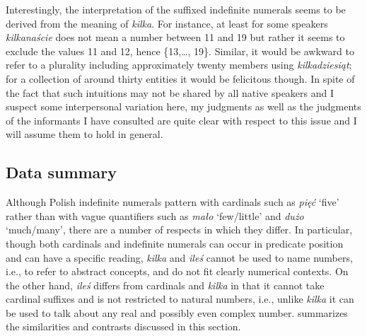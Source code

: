 \documentclass[output=paper,
]{langscibook}
\begin{document}
	\noindent Interestingly, the interpretation of the suffixed indefinite numerals seems to be derived from the meaning of \textit{kilka}. For instance, at least for some speakers \textit{kilkanaście} does not mean a number between 11 and 19 but rather it seems to exclude the values 11 and 12, hence \{13,\dots, 19\}. Similar, it would be awkward to refer to a plurality including approximately twenty members using \textit{kilkadziesiąt}; for a collection of around thirty entities it would be felicitous though. In spite of the fact that such intuitions may not be shared by all native speakers and I suspect some interpersonal variation here, my judgments as well as the judgments of the informants I have consulted are quite clear with respect to this issue and I will assume them to hold in general. 
	
	\subsection{Data summary}\label{sec:data-summary2}
	
	Although Polish indefinite numerals pattern with cardinals such as \textit{pięć} `five' rather than with vague quantifiers such as \textit{mało} `few/little' and \textit{dużo} `much/many', there are a number of respects in which they differ. In particular, though both cardinals and indefinite numerals can occur in predicate position and can have a specific reading, \textit{kilka} and \textit{ileś} cannot be used to name numbers, i.e., to refer to abstract concepts, and do not fit clearly numerical contexts. On the other hand, \textit{ileś} differs from cardinals and \textit{kilka} in that it cannot take cardinal suffixes and is not restricted to natural numbers, i.e., unlike \textit{kilka} it can be used to talk about any real and possibly even complex number.  summarizes the similarities and contrasts discussed in this section.
	
\end{document}
